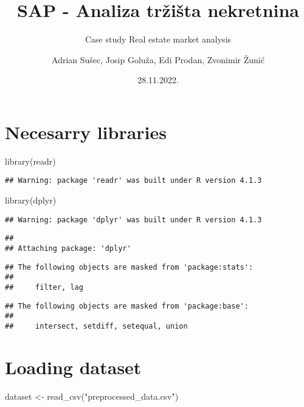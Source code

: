 \documentclass[
]{article}
\title{SAP - Analiza tržišta nekretnina}
\subtitle{Case study Real estate market analysis}
\author{Adrian Sušec, Josip Goluža, Edi Prodan, Zvonimir Žunić}
\date{28.11.2022.}
\newenvironment{Shaded}{\begin{snugshade}}{\end{snugshade}}
\newcommand{\FunctionTok}[1]{\textcolor[rgb]{0.00,0.00,0.00}{#1}}
\newcommand{\NormalTok}[1]{#1}
\newcommand{\OtherTok}[1]{\textcolor[rgb]{0.56,0.35,0.01}{#1}}
\newcommand{\StringTok}[1]{\textcolor[rgb]{0.31,0.60,0.02}{#1}}
\begin{document}
\maketitle

\hypertarget{necesarry-libraries}{%
\section{Necesarry libraries}\label{necesarry-libraries}}

\begin{Shaded}
\begin{Highlighting}[]
\FunctionTok{library}\NormalTok{(readr)}
\end{Highlighting}
\end{Shaded}

\begin{verbatim}
## Warning: package 'readr' was built under R version 4.1.3
\end{verbatim}

\begin{Shaded}
\begin{Highlighting}[]
\FunctionTok{library}\NormalTok{(dplyr)}
\end{Highlighting}
\end{Shaded}

\begin{verbatim}
## Warning: package 'dplyr' was built under R version 4.1.3
\end{verbatim}

\begin{verbatim}
## 
## Attaching package: 'dplyr'
\end{verbatim}

\begin{verbatim}
## The following objects are masked from 'package:stats':
## 
##     filter, lag
\end{verbatim}

\begin{verbatim}
## The following objects are masked from 'package:base':
## 
##     intersect, setdiff, setequal, union
\end{verbatim}

\hypertarget{loading-dataset}{%
\section{Loading dataset}\label{loading-dataset}}

\begin{Shaded}
\begin{Highlighting}[]
\NormalTok{dataset }\OtherTok{\textless{}{-}} \FunctionTok{read\_csv}\NormalTok{(}\StringTok{"preprocessed\_data.csv"}\NormalTok{)}
\end{Highlighting}
\end{Shaded}
\end{document}
